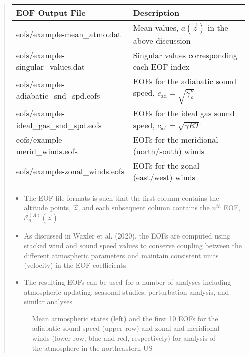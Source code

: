 \documentclass[letterpaper,10pt,english]{sphinxmanual}
\let\sphinxpxdimen\pdfpxdimen\else\newdimen\sphinxpxdimen
\begin{document}
\begin{itemize}
\begin{quote}
\begin{savenotes}\sphinxattablestart
\centering
\begin{tabulary}{\linewidth}[t]{|T|T|}
\hline
\sphinxstyletheadfamily 
EOF Output File
&\sphinxstyletheadfamily 
Description
\\
\hline
eofs/example-mean\_atmo.dat
&
Mean values, \(\bar{a} \left( \vec{z} \right)\) in the above discussion
\\
\hline
eofs/example-singular\_values.dat
&
Singular values corresponding each EOF index
\\
\hline
eofs/example-adiabatic\_snd\_spd.eofs
&
EOFs for the adiabatic sound speed, \(c_\text{ad} = \sqrt{ \gamma \frac{p}{\rho}}\)
\\
\hline
eofs/example-ideal\_gas\_snd\_spd.eofs
&
EOFs for the ideal gas sound speed, \(c_\text{ad} = \sqrt{ \gamma R T}\)
\\
\hline
eofs/example-merid\_winds.eofs
&
EOFs for the meridional (north/south) winds
\\
\hline
eofs/example-zonal\_winds.eofs
&
EOFs for the zonal (east/west) winds
\\
\hline
\end{tabulary}
\par
\sphinxattableend\end{savenotes}
\begin{itemize}
\item {} 
The EOF file formats is such that the first column contains the altitude points, \(\vec{z}\), and each subsequent column contains the \(n^{th}\) EOF, \(\mathcal{E}_n^{(A)} \left( \vec{z} \right)\)

\item {} 
As discussed in Waxler et al. (2020), the EOFs are computed using stacked wind and sound speed values to conserve coupling between the different atmospheric parameters and maintain consistent units (velocity) in the EOF coefficients

\item {} 
The resulting EOFs can be used for a number of analyses including atmospheric updating, seasonal studies, perturbation analysis, and similar analyses

\end{itemize}

\begin{figure}[htbp]
\centering
\capstart

\noindent\sphinxincludegraphics[width=1000\sphinxpxdimen]{{US_NE-eofs}.png}
\caption{Mean atmospheric states (left) and the first 10 EOFs for the adiabatic sound speed (upper row) and zonal and meridional winds (lower row, blue and red, respectively) for analysis of the atmosphere in the northeastern US}\label{\detokenize{eofs:id1}}\end{figure}



\end{quote}
\end{itemize}
\end{document}
